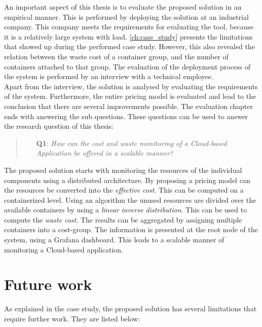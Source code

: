 \noindent
An important aspect of this thesis is to evaluate the proposed solution in an empirical manner. This is performed by deploying the solution at an industrial company. This company meets the requirements for evaluating the tool, because it is a relatively large system with load. \autoref{ch:case_study} presents the limitations that showed up during the performed case study. However, this also revealed the relation between the waste cost of a container group, and the number of containers attached to that group. The evaluation of the deployment process of the system is performed by an interview with a technical employee.\\

\noindent
Apart from the interview, the solution is analysed by evaluating the requirements of the system. Furthermore, the entire pricing model is evaluated and lead to the conclusion that there are several improvements possible. The evaluation chapter ends with answering the sub questions. These questions can be used to answer the research question of this thesis:

\begin{quote}
    \begin{itemize}
        \item[\textbf{Q1}: ]\textit{How can the cost and waste monitoring of a Cloud-based Application be offered in a scalable manner?}
    \end{itemize}
\end{quote}

\noindent
The proposed solution starts with monitoring the resources of the individual components using a distributed architecture. By proposing a pricing model can the resources be converted into the \textit{effective cost}. This can be computed on a containerized level. Using an algorithm the unused resources are divided over the available containers by using a \textit{linear inverse distribution}. This can be used to compute the \textit{waste cost}. The results can be aggregated by assigning multiple containers into a cost-group. The information is presented at the root node of the system, using a Grafana dashboard. This leads to a scalable manner of monitoring a Cloud-based application.

\section{Future work} \label{sec:future_work}
As explained in the case study, the proposed solution has several limitations that require further work. They are listed below:


